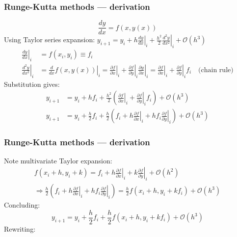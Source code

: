 \documentclass[11pt,table,final,fleqn,xcolor={usenames,dvipsnames,table}]{beamer}
\begin{document}
\begin{frame}
  \frametitle{Runge-Kutta methods --- derivation}
  \footnotesize\selectfont
  \[ \frac{dy}{dx} = f(x,y(x)) \]
  \pause Using Taylor series expansion: $\displaystyle     y_{i+1} = y_i + h \left.\frac{dy}{dx}\right|_i + \left.\frac{h^2}{2}\frac{d^2y}{dx^2}\right|_i + \mathcal{O}{(h^3)} $
  \begin{align*}
    \left.\frac{dy}{dx}\right|_i &= f(x_i,y_i) \equiv f_i \\
    \left.\frac{d^2y}{dx^2}\right|_i &= \left.\frac{d}{dx}f(x,y(x))\right|_i = \left.\frac{\partial f}{\partial x}\right|_i + \left.\frac{\partial f}{\partial y}\right|_i \left.\frac{\partial y}{\partial x}\right|_i = \left.\frac{\partial f}{\partial x}\right|_i + \left.\frac{\partial f}{\partial y}\right|_i f_i \quad \text{(chain rule)}
  \end{align*}
  \pause Substitution gives:
   \begin{align*}
    y_{i+1} &= y_i + h f_i + \frac{h^2}{2} \left( \left.\frac{\partial f}{\partial x}\right|_i +  \left.\frac{\partial f}{\partial y}\right|_i f_i \right) + \mathcal{O}{(h^3)} \\
    y_{i+1} &= y_i + \frac{h}{2} f_i + \frac{h}{2} \left( f_i + h\left.\frac{\partial f}{\partial x}\right|_i + h f_i \left.\frac{\partial f}{\partial y}\right|_i \right) + \mathcal{O}{(h^3)}
  \end{align*}
\end{frame}

\begin{frame}
  \frametitle{Runge-Kutta methods --- derivation}
  Note multivariate Taylor expansion:
  \begin{multline*}
    f(x_i+h,y_i+k) = f_i + h \left. \frac{\partial f}{\partial x}\right|_i + k\left. \frac{\partial f}{\partial y}\right|_i + \mathcal{O}{(h^2)} \\
    \Rightarrow \frac{h}{2}\left(f_i + h\left.\frac{\partial f}{\partial x}\right|_i + h f_i \left. \frac{\partial f}{\partial y} \right|_i \right) = \frac{h}{2} f\left(x_i+h,y_i+kf_i\right) + \mathcal{O}{(h^3)}
  \end{multline*}
  Concluding:
  \[
    y_{i+1} = y_i + \frac{h}{2} f_i + \frac{h}{2} f\left(x_i+h,y_i+kf_i\right) + \mathcal{O}{(h^3)}
  \]
  Rewriting:\\
\end{frame}
\end{document}
